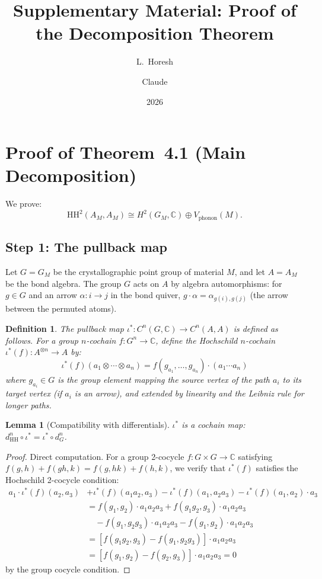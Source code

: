 \documentclass[12pt,a4paper]{article}
\title{Supplementary Material: Proof of the Decomposition Theorem}
\author{L.\ Horesh \and Claude}
\date{2026}
\newtheorem{lemma}[theorem]{Lemma}
\newtheorem{definition}[theorem]{Definition}
\newcommand{\HH}{\mathrm{HH}}
\newcommand{\CC}{\mathbb{C}}
\begin{document}
\maketitle

\section{Proof of Theorem~4.1 (Main Decomposition)}
\label{sec:proof-decomposition}

We prove:
\[
\HH^2(A_M, A_M) \cong H^2(G_M, \CC) \oplus V_{\mathrm{phonon}}(M).
\]

\subsection{Step 1: The pullback map}

Let $G = G_M$ be the crystallographic point group of material $M$,
and let $A = A_M$ be the bond algebra. The group $G$ acts on $A$ by
algebra automorphisms: for $g \in G$ and an arrow $\alpha: i \to j$
in the bond quiver, $g \cdot \alpha = \alpha_{g(i), g(j)}$ (the
arrow between the permuted atoms).

\begin{definition}
The \emph{pullback map} $\iota^*: C^n(G, \CC) \to C^n(A, A)$ is
defined as follows. For a group $n$-cochain $f: G^n \to \CC$, define
the Hochschild $n$-cochain $\iota^*(f): A^{\otimes n} \to A$ by:
\[
\iota^*(f)(a_1 \otimes \cdots \otimes a_n) =
f(g_{a_1}, \ldots, g_{a_n}) \cdot (a_1 \cdots a_n)
\]
where $g_{a_i} \in G$ is the group element mapping the source vertex
of the path $a_i$ to its target vertex (if $a_i$ is an arrow), and
extended by linearity and the Leibniz rule for longer paths.
\end{definition}

\begin{lemma}[Compatibility with differentials]
\label{lem:pullback-cochain-map}
$\iota^*$ is a cochain map: $d^n_{\HH} \circ \iota^* = \iota^* \circ d^n_G$.
\end{lemma}

\begin{proof}
Direct computation. For a group 2-cocycle $f: G \times G \to \CC$
satisfying $f(g,h) + f(gh,k) = f(g,hk) + f(h,k)$, we verify that
$\iota^*(f)$ satisfies the Hochschild 2-cocycle condition:
\begin{align*}
a_1 \cdot \iota^*(f)(a_2, a_3)
&+ \iota^*(f)(a_1 a_2, a_3) - \iota^*(f)(a_1, a_2 a_3) - \iota^*(f)(a_1, a_2) \cdot a_3 \\
&= f(g_1, g_2) \cdot a_1 a_2 a_3 + f(g_1 g_2, g_3) \cdot a_1 a_2 a_3 \\
&\quad - f(g_1, g_2 g_3) \cdot a_1 a_2 a_3 - f(g_1, g_2) \cdot a_1 a_2 a_3 \\
&= [f(g_1 g_2, g_3) - f(g_1, g_2 g_3)] \cdot a_1 a_2 a_3 \\
&= [f(g_1, g_2) - f(g_2, g_3)] \cdot a_1 a_2 a_3 = 0
\end{align*}
by the group cocycle condition.
\end{proof}
\end{document}
